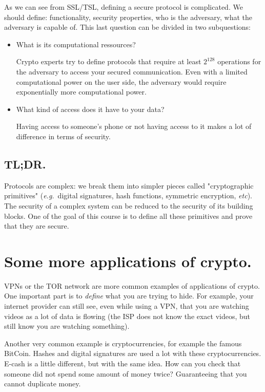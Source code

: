 \documentclass[./main]{subfiles}
\begin{document}
  As we can see from SSL/TSL, defining a secure protocol is complicated.
  We should define: functionality, security properties, who is the adversary, what the adversary is capable of.
  This last question can be divided in two subquestions:
  \begin{itemize}
    \item What is its computational ressources?

      Crypto experts try to define protocols that require at least $2^{128}$ operations for the adversary to access your secured communication.
      Even with a limited computational power on the user side, the adversary would require exponentially more computational power.

    \item What kind of access does it have to your data?

      Having access to someone's phone or not having access to it makes a lot of difference in terms of security.
  \end{itemize}

  \subsection{TL;DR.}

  Protocols are complex: we break them into simpler pieces called "cryptographic primitives" (\textit{e.g.}\ digital signatures, hash functions, symmetric encryption, \textit{etc}).
  The security of a complex system can be reduced to the security of its building blocks.
  One of the goal of this course is to define all these primitives and prove that they are secure.

  \section{Some more applications of crypto.}

  VPNs or the TOR network are more common examples of applications of crypto.
  One important part is to \textit{define} what you are trying to hide.
  For example, your internet provider can still see, even while using a VPN, that you are watching videos as a lot of data is flowing (the ISP does not know the exact videos, but still know you are watching something).

  Another very common example is cryptocurrencies, for example the famous BitCoin.
  Hashes and digital signatures are used a lot with these cryptocurrencies.
  E-cash is a little different, but with the same idea.
  How can you check that someone did not spend some amount of money twice?
  Guaranteeing that you cannot duplicate money.
\end{document}
